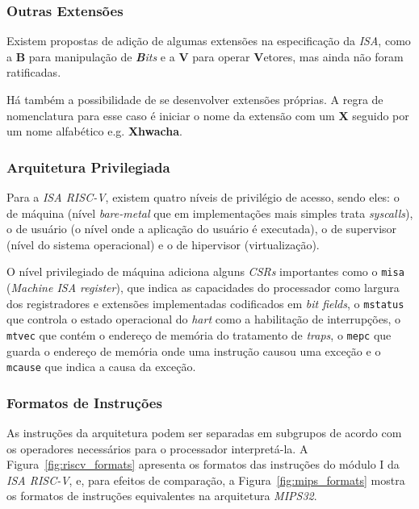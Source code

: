         \subsubsection{Outras Extensões}
        { Existem propostas de adição de algumas extensões na especificação da
            \textit{ISA}, como a \textbf{B} para manipulação de \textit{\textbf{B}its}
            e a \textbf{V} para operar \textbf{V}etores, mas ainda não foram
            ratificadas.
        }

        {Há também a possibilidade de se desenvolver extensões próprias. A regra
            de nomenclatura para esse caso é iniciar o nome da extensão com um
            \textbf{X} seguido por um nome alfabético e.g. \textbf{Xhwacha}.
        }

        \subsubsection{Arquitetura Privilegiada}
        { Para a \textit{ISA RISC-V}, existem quatro níveis de privilégio de acesso,
            sendo eles: o de máquina (nível \textit{bare-metal} que em implementações
            mais simples trata \textit{syscalls}), o de usuário (o nível onde a
            aplicação do usuário é executada), o de supervisor (nível do sistema
            operacional) e o de hipervisor (virtualização).
        }

        { O nível privilegiado de máquina adiciona alguns \textit{CSRs} importantes
            como o \texttt{misa} (\textit{Machine ISA register}), que indica as
            capacidades do processador como largura dos registradores e extensões
            implementadas codificados em \textit{bit fields}, o \texttt{mstatus}
            que controla o estado operacional do \textit{hart} como a habilitação
            de interrupções, o \texttt{mtvec} que contém o endereço de memória
            do tratamento de \textit{traps}, o \texttt{mepc} que guarda o endereço
            de memória onde uma instrução causou uma exceção e o \texttt{mcause}
            que indica a causa da exceção.
        }

        \subsubsection{Formatos de Instruções}
        { As instruções da arquitetura podem ser separadas em subgrupos de acordo com
            os operadores necessários para o processador interpretá-la. A
            Figura~\ref{fig:riscv_formats} apresenta os formatos das instruções do
            módulo I da \textit{ISA RISC-V}, e, para efeitos de comparação, a
            Figura~\ref{fig:mips_formats} mostra os formatos de instruções equivalentes
            na arquitetura \textit{MIPS32}.
        }


